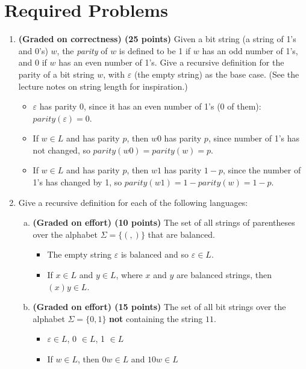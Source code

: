 \documentclass{article}
\theoremstyle{definition}
\newenvironment {solution}
{
\begin{tcolorbox}
}
{
\end{tcolorbox}
}
\begin{document}
\section{Required Problems}
\begin{enumerate}
    \item \textbf{(Graded on correctness) (25 points)} Given a bit string (a string of 1's and 0's) $w$, the \emph{parity} of $w$ is defined to be 1 if $w$ has an odd number of 1's, and 0 if $w$ has an even number of 1's. Give a recursive definition for the parity of a bit string $w$, with $\varepsilon$ (the empty string) as the base case. (See the lecture notes on string length for inspiration.)
    \begin{itemize}
        \item $\varepsilon$ has parity 0, since it has an even number of 1's (0 of them): $parity(\varepsilon) = 0$.
        \item If $w \in L$ and has parity $p$, then $w0$ has parity $p$, since number of 1's has not changed, so $parity(w0) = parity(w) = p$.
        \item If $w \in L$ and has parity $p$, then $w1$ has parity $1-p$, since the number of 1's has changed by 1, so $parity(w1) = 1 - parity(w) = 1 - p$.
    \end{itemize}
    \item Give a recursive definition for each of the following languages:
    \begin{enumerate}[(a)]
        \item \textbf{(Graded on effort) (10 points)} The set of all strings of parentheses over the alphabet $\Sigma = \{(, )\}$ that are balanced.
            \begin{solution}
                \begin{itemize}
                    \item The empty string $\varepsilon$ is balanced and so $\varepsilon \in L$.
                    \item If $x \in L$ and $y \in L$, where $x$ and $y$ are balanced strings, then $(x)y \in L$.
                \end{itemize}
		\end{solution}
        \item \textbf{(Graded on effort) (15 points)} The set of all bit strings over the alphabet $\Sigma = \{0, 1\}$ \textbf{not} containing the string $11$.
 		\begin{solution}
	      \begin{itemize}
            \item $\varepsilon \in L$, 0 $\in L$, 1 $\in L$
            \item If $w \in L$, then $0w \in L$ and $10w \in L$
          \end{itemize}
		\end{solution}
    \end{enumerate}


\end{enumerate}
\end{document}
